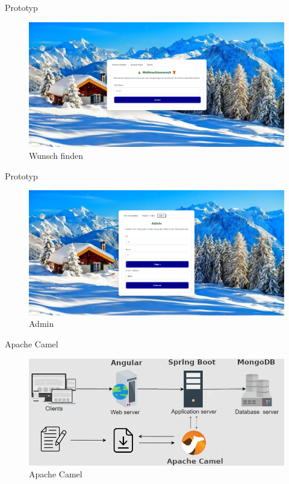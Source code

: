 \documentclass{beamer}
\begin{document}
\begin{frame}{Prototyp}
\begin{figure}
    \centering
\includegraphics[width=\textwidth, keepaspectratio]{funk2}
\caption{Wunsch finden \cite{f}\cite{g}}
\end{figure}
\end{frame}

\begin{frame}{Prototyp}
\begin{figure}
    \centering
\includegraphics[width=\textwidth, keepaspectratio]{funk3}
\caption{Admin \cite{f}\cite{g}}
\end{figure}
\end{frame}

\begin{frame}{Apache Camel}
\begin{figure}
    \centering
\includegraphics[width=\textwidth, keepaspectratio]{apachecamel}
\caption{Apache Camel \cite{c}\cite{d}\cite{e}}
\end{figure}
\end{frame}
\end{document}
